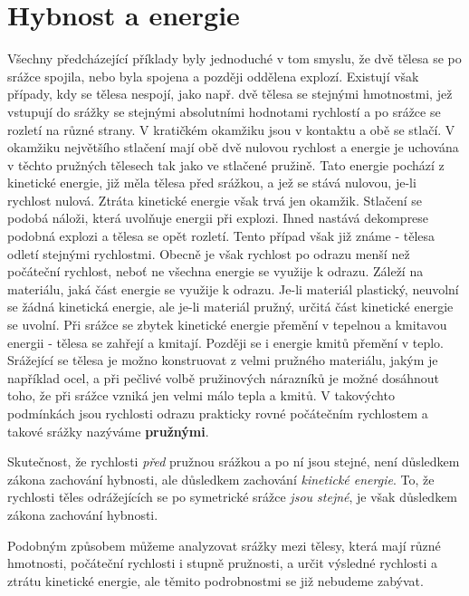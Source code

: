 {{  \section{Hybnost a energie}
    Všechny předcházející příklady byly jednoduché v tom smyslu, že dvě tělesa se po srážce 
    spojila, nebo byla spojena a později oddělena explozí. Existují však případy, kdy se tělesa 
    nespojí, jako např. dvě tělesa se stejnými hmotnostmi, jež vstupují do srážky se stejnými 
    absolutními hodnotami rychlostí a po srážce se rozletí na různé strany. V kratičkém okamžiku 
    jsou v kontaktu a obě se stlačí. V okamžiku největšího stlačení mají obě dvě nulovou rychlost a 
    energie je uchována v těchto pružných tělesech tak jako ve stlačené pružině. Tato energie 
    pochází z kinetické energie, již měla tělesa před srážkou, a jež se stává nulovou, je-li 
    rychlost nulová. Ztráta kinetické energie však trvá jen okamžik. Stlačení se podobá náloži, 
    která uvolňuje energii při explozi. Ihned nastává dekomprese podobná explozi a tělesa se 
    opět rozletí. Tento případ však již známe - tělesa odletí stejnými rychlostmi. Obecně je však 
    rychlost po  odrazu menší než počáteční rychlost, neboť ne všechna energie se využije k odrazu. 
    Záleží na materiálu, jaká část energie se využije k odrazu. Je-li materiál plastický, neuvolní 
    se žádná kinetická energie, ale je-li materiál pružný, určitá část kinetické energie se uvolní. 
    Při srážce se zbytek kinetické energie přemění v tepelnou a kmitavou energii - tělesa se 
    zahřejí a kmitají. Později se i energie kmitů přemění v teplo. Srážející se tělesa je možno 
    konstruovat z velmi pružného materiálu, jakým je například ocel, a při pečlivé volbě 
    pružinových nárazníků je možné dosáhnout toho, že při srážce vzniká jen velmi málo tepla a 
    kmitů. V takovýchto podmínkách jsou rychlosti odrazu prakticky rovné počátečním rychlostem a 
    takové srážky nazýváme \textbf{pružnými}.
    
    Skutečnost, že rychlosti \emph{před} pružnou srážkou a po ní jsou stejné, není důsledkem zákona 
    zachování hybnosti, ale důsledkem zachování \emph{kinetické energie}. To, že rychlosti těles 
    odrážejících se po symetrické srážce \emph{jsou stejné}, je však důsledkem zákona zachování 
    hybnosti.
    
    Podobným způsobem můžeme analyzovat srážky mezi tělesy, která mají různé hmotnosti, počáteční 
    rychlosti i stupně pružnosti, a určit výsledné rychlosti a ztrátu kinetické energie, ale těmito 
    podrobnostmi se již nebudeme zabývat.
    
}}
